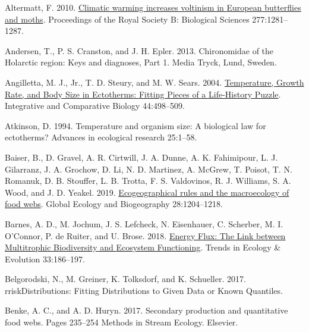 \documentclass[
]{article}
\newlength{\cslhangindent}
\newlength{\cslentryspacingunit} %
\newenvironment{CSLReferences}[2] %
 {%
  \setlength{\parindent}{0pt}
  \ifodd #1
  \let\oldpar\par
  \def\par{\hangindent=\cslhangindent\oldpar}
  \fi
  \setlength{\parskip}{#2\cslentryspacingunit}
 }%
 {}
\begin{document}
\hypertarget{refs}{}
\begin{CSLReferences}{1}{0}
\leavevmode{}%
Altermatt, F. 2010.
\href{https://doi.org/10.1098/rspb.2009.1910}{Climatic warming increases
voltinism in {European} butterflies and moths}. Proceedings of the Royal
Society B: Biological Sciences 277:1281--1287.

\leavevmode{}%
Andersen, T., P. S. Cranston, and J. H. Epler. 2013. Chironomidae of the
{Holarctic} region: {Keys} and diagnoses, {Part} 1. {Media Tryck},
{Lund, Sweden}.

\leavevmode{}%
Angilletta, M. J., Jr., T. D. Steury, and M. W. Sears. 2004.
\href{https://doi.org/10.1093/icb/44.6.498}{Temperature, {Growth Rate},
and {Body Size} in {Ectotherms}: {Fitting Pieces} of a {Life-History
Puzzle}}. Integrative and Comparative Biology 44:498--509.

\leavevmode{}%
Atkinson, D. 1994. Temperature and organism size: A biological law for
ectotherms? Advances in ecological research 25:1--58.

\leavevmode{}%
Baiser, B., D. Gravel, A. R. Cirtwill, J. A. Dunne, A. K. Fahimipour, L.
J. Gilarranz, J. A. Grochow, D. Li, N. D. Martinez, A. McGrew, T.
Poisot, T. N. Romanuk, D. B. Stouffer, L. B. Trotta, F. S. Valdovinos,
R. J. Williams, S. A. Wood, and J. D. Yeakel. 2019.
\href{https://doi.org/10.1111/geb.12925}{Ecogeographical rules and the
macroecology of food webs}. Global Ecology and Biogeography
28:1204--1218.

\leavevmode{}%
Barnes, A. D., M. Jochum, J. S. Lefcheck, N. Eisenhauer, C. Scherber, M.
I. O'Connor, P. de Ruiter, and U. Brose. 2018.
\href{https://doi.org/10.1016/j.tree.2017.12.007}{Energy {Flux}: {The
Link} between {Multitrophic Biodiversity} and {Ecosystem Functioning}}.
Trends in Ecology \& Evolution 33:186--197.

\leavevmode{}%
Belgorodski, N., M. Greiner, K. Tolksdorf, and K. Schueller. 2017.
{rriskDistributions}: {Fitting Distributions} to {Given Data} or {Known
Quantiles}.

\leavevmode{}%
Benke, A. C., and A. D. Huryn. 2017. Secondary production and
quantitative food webs. Pages 235--254 Methods in {Stream Ecology}.
{Elsevier}.


\end{CSLReferences}
\end{document}
